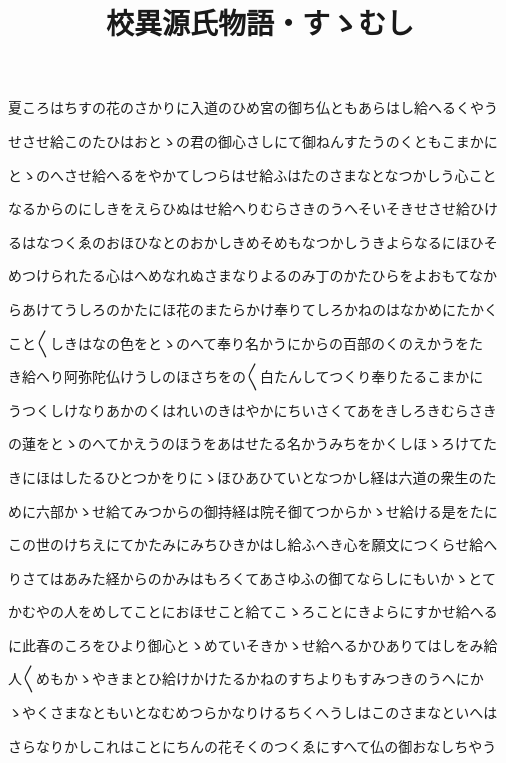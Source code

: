 \documentclass[a4paper,11pt,landscape]{ltjtarticle}
\title{校異源氏物語・すゝむし}
\date{}
\begin{document}
\maketitle

夏ころはちすの花のさかりに入道のひめ宮の御ち仏ともあらはし給へるくやう
\par\medskip
せさせ給このたひはおとゝの君の御心さしにて御ねんすたうのくともこまかに
\par\medskip
とゝのへさせ給へるをやかてしつらはせ給ふはたのさまなとなつかしう心こと
\par\medskip
なるからのにしきをえらひぬはせ給へりむらさきのうへそいそきせさせ給ひけ
\par\medskip
るはなつくゑのおほひなとのおかしきめそめもなつかしうきよらなるにほひそ
\par\medskip
めつけられたる心はへめなれぬさまなりよるのみ丁のかたひらをよおもてなか
\par\medskip
らあけてうしろのかたにほ花のまたらかけ奉りてしろかねのはなかめにたかく
\par\medskip
こと〱しきはなの色をとゝのへて奉り名かうにからの百部のくのえかうをた
\par\medskip
き給へり阿弥陀仏けうしのほさちをの〱白たんしてつくり奉りたるこまかに
\par\medskip
うつくしけなりあかのくはれいのきはやかにちいさくてあをきしろきむらさき
\par\medskip
の蓮をとゝのへてかえうのほうをあはせたる名かうみちをかくしほゝろけてた
\par\medskip
きにほはしたるひとつかをりにゝほひあひていとなつかし経は六道の衆生のた
\par\medskip
めに六部かゝせ給てみつからの御持経は院そ御てつからかゝせ給ける是をたに
\par\medskip
この世のけちえにてかたみにみちひきかはし給ふへき心を願文につくらせ給へ
\par\medskip
りさてはあみた経からのかみはもろくてあさゆふの御てならしにもいかゝとて
\par\medskip
かむやの人をめしてことにおほせこと給てこゝろことにきよらにすかせ給へる
\par\medskip
に此春のころをひより御心とゝめていそきかゝせ給へるかひありてはしをみ給
\par\medskip
人〱めもかゝやきまとひ給けかけたるかねのすちよりもすみつきのうへにか
\par\medskip
ゝやくさまなともいとなむめつらかなりけるちくへうしはこのさまなといへは
\par\medskip
さらなりかしこれはことにちんの花そくのつくゑにすへて仏の御おなしちやう
\end{document}
